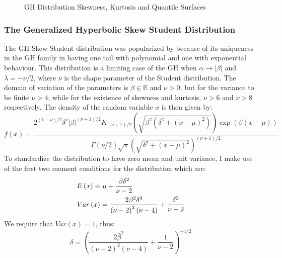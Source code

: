 \begin{landscape}
\begin{figure}[!ht]
\caption[GH Distribution Skewness, Kurtosis and Quantile Surfaces]{GH Distribution Skewness, Kurtosis and Quantile Surfaces}\label{fig:ghsurface}
\end{figure}
\end{landscape}

\subsubsection{The Generalized Hyperbolic Skew Student Distribution}\label{ghskt}
The GH Skew-Student distribution was popularized by \cite{Aas2006} because of its uniqueness
in the GH family in having one tail with polynomial and one with exponential behaviour.
This distribution is a limiting case of the GH when $\alpha  \to \left| \beta  \right|$
and $\lambda=-\nu/2$, where $\nu$ is the shape parameter of the Student distribution.
The domain of variation of the parameters is $\beta  \in \mathbb{R}$ and $\nu>0$, but
for the variance to be finite $\nu>4$, while for the existence of skewness and kurtosis,
$\nu>6$ and $\nu>8$ respectively. The density of the random variable $x$ is then given
by:
\begin{equation}
f\left( x \right) = \frac{{{2^{\left( {1 - \nu } \right)/2}}{\delta ^\nu }{{\left| \beta  \right|}^{\left( {\nu  + 1} \right)/2}}{K_{\left( {\nu  + 1} \right)/2}}\left( {\sqrt {{\beta ^2}\left( {{\delta ^2} + {{\left( {x - \mu } \right)}^2}} \right)} } \right)\exp \left( {\beta \left( {x - \mu } \right)} \right)}}
{{\Gamma \left( {\nu /2} \right)\sqrt \pi  {{\left( {\sqrt {{\delta ^2} + {{\left( {x - \mu } \right)}^2}} } \right)}^{\left( {\nu  + 1} \right)/2}}}}
\end{equation}
To standardize the distribution to have zero mean and unit variance, I make use
of the first two moment conditions for the distribution which are:
\begin{equation}
\begin{gathered}
  E\left( x \right) = \mu  + \frac{{\beta {\delta ^2}}}
{{\nu  - 2}} \hfill \\
  Var\left( x \right) = \frac{{2{\beta ^2}{\delta ^4}}}
{{{{\left( {\nu  - 2} \right)}^2}\left( {\nu  - 4} \right)}} + \frac{{{\delta ^2}}}
{{\nu  - 2}} \hfill \\
\end{gathered}
\end{equation}
We require that $Var(x)=1$, thus:
\begin{equation}
\delta  = {\left( {\frac{{2{{\bar \beta }^2}}}
{{{{\left( {\nu  - 2} \right)}^2}\left( {\nu  - 4} \right)}} + \frac{1}
{{\nu  - 2}}} \right)^{ - 1/2}}
\end{equation}
